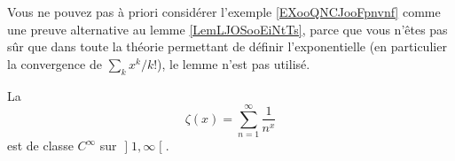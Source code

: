 \begin{remark}
	Vous ne pouvez pas à priori considérer l'exemple \ref{EXooQNCJooFpnvnf} comme une preuve alternative au lemme \ref{LemLJOSooEiNtTs}, parce que vous n'êtes pas sûr que dans toute la théorie permettant de définir l'exponentielle (en particulier la convergence de \( \sum_kx^k/k!\)), le lemme n'est pas utilisé.
\end{remark}


\begin{lemma}
	La 
	\begin{equation}
		\zeta(x)=\sum_{n=1}^{\infty}\frac{1}{ n^x }
	\end{equation}
	est de classe \( C^{\infty}\) sur \( \mathopen] 1 , \infty \mathclose[\).
\end{lemma}

